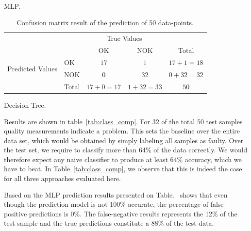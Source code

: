 \documentclass[5p,times,procedia]{elsarticle}
\begin{document}
\begin{table}
\begin{subtable}[h]{0.3\textwidth}
              \caption{MLP.}
              \label{tab:MPL_conf_matrix}
       \end{subtable}
       \begin{subtable}[h]{0.3\textwidth}
              \centering
              \begin{adjustbox}{width=1.6\textwidth}
              \begin{tabular}{l|l|c|c|c}
                     \multicolumn{2}{c}{}&\multicolumn{2}{c}{True Values}&\\
                     \cline{3-4}
                     \multicolumn{2}{c|}{}& OK & NOK &\multicolumn{1}{c}{Total}\\
                     \cline{2-4}
                     \multirow{2}{*}{Predicted Values}& OK & $17$ & $1$ & $17+1 = 18$\\
                     \cline{2-4}
                     & NOK & $0$ & $32$ & $0+32 = 32$\\
                     \cline{2-4}
                     \multicolumn{1}{c}{} & \multicolumn{1}{c}{Total} & \multicolumn{1}{c}{$17+0 = 17$} & \multicolumn{    1}{c}{$1+32 = 33$} & \multicolumn{1}{c}{$50$}\\
              \end{tabular}
              \end{adjustbox}
              \caption{Decision Tree.}
              \label{tab:Tree_conf_matrix}
       \end{subtable}
       \caption{Confusion matrix result of the prediction of 50 data-points.}
       \label{tab:Confusion_matrix}
\end{table}


Results are shown in table~\ref{tab:class_comp}. For 32 of the total 50 test samples
quality measurements indicate a problem. This sets the 
baseline over the entire data set, which would be obtained by simply labeling all samples
as faulty. Over the test set, we require to classify more than 64\% of the data correctly.
We would therefore expect any naive classifier to produce at least 64\% accuracy, which we have to beat. In Table~\ref{tab:class_comp}, we observe that this is indeed the case for all three approaches evaluated here.

Based on the MLP prediction results presented on Table.~ shows that even though the prediction model is not 100\% accurate, the percentage of false-positive predictions is 0\%. The false-negative results represents the 12\% of the test sample and the true predictions constitute a 88\% of the test data.
\end{document}
